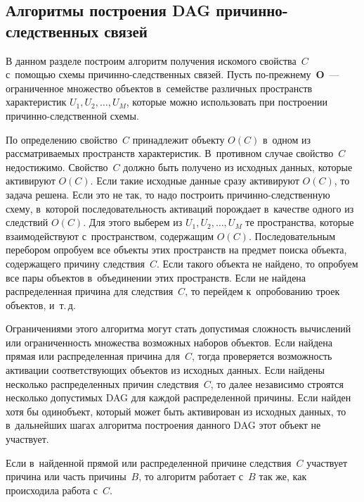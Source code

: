 \begin{multicols}{2}
  \section{Алгоритмы построения DAG причинно-следственных 
связей}
  
  В данном разделе построим алгоритм получения искомого свойства~$C$ 
с~помощью схемы при\-чин\-но-след\-ст\-вен\-ных связей. Пусть  
по-преж\-не\-му~$\bm{O}$~--- ограниченное множество объектов в~семействе 
различных пространств характеристик $U_1, U_2, \ldots , U_M$, которые можно 
использовать при построении  
при\-чин\-но-след\-ст\-вен\-ной схемы.
  
  По определению свойство~$C$ принадлежит объекту $O(C)$ в~одном из 
рассматриваемых пространств характеристик. В~противном случае свойство~$C$ 
недостижимо. Свойство~$C$ должно быть получено из исходных данных, 
которые активируют $O(C)$. Если такие исходные данные сразу активируют 
$O(C)$, то задача решена. Если это не так, то надо построить 
 при\-чин\-но-след\-ст\-вен\-ную схему, в~которой последовательность активаций 
порождает в~качестве одного из следствий $O(C)$. Для этого выберем из $U_1, 
U_2, \ldots , U_M$ те пространства, которые взаимодействуют с~пространством, 
содержащим $O(C)$. Последовательным перебором опробуем все объекты этих 
пространств на предмет поиска объекта, содержащего причину следствия~$C$. 
Если такого объекта не найдено, то опробуем все пары объектов в~объединении 
этих пространств. Если не найдена распределенная причина для следствия~$C$, 
то перейдем к~опробованию троек объектов, и~т.\,д. 
{

}
  
  Ограничениями этого алгоритма могут стать допустимая сложность 
вычислений или ограниченность множества возможных наборов объектов. Если 
найдена прямая или распределенная причина для~$C$, тогда проверяется 
возможность активации соответствующих объектов из исходных данных. Если 
найдены несколько распределенных причин следствия~$C$, то далее независимо 
строятся несколько допустимых DAG для каждой распределенной причины. Если 
найден хотя бы один\linebreak объект, который может быть активирован из исходных 
данных, то в~дальнейших шагах алгоритма построения данного DAG этот объект 
не участ\-вует. 
{

}
  
  Если в~найденной прямой или распределенной причине следствия~$C$ 
участвует причина или часть причины~$B$, то алгоритм работает с~$B$ так же, 
как происходила работа с~$C$. 
  

\end{multicols}

